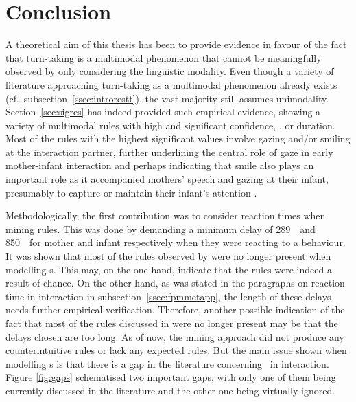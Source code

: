 
\chapter{Conclusion}
\label{ch:con}
A theoretical aim of this thesis has been to provide evidence in favour of the fact that turn-taking is a multimodal phenomenon that cannot be meaningfully observed by only considering the linguistic modality.
Even though a variety of literature approaching turn-taking as a multimodal phenomenon already exists (cf.~subsection~\ref{ssec:introrestt}), the vast majority still assumes unimodality.
Section~\ref{sec:sigres} has indeed provided such empirical evidence, showing a variety of multimodal rules with high and significant confidence, \noc, or duration.
Most of the rules with the highest significant values involve gazing and/or smiling at the interaction partner, further underlining the central role of gaze in early mother-infant interaction and perhaps indicating that smile also plays an important role as it accompanied mothers' speech and gazing at their infant, presumably to capture or maintain their infant's attention \citep{nomikou_educating_2013,nomikou_constructing_2016}.

Methodologically, the first contribution was to consider reaction times when mining rules.
This was done by demanding a minimum delay of 289~\ms\ and 850~\ms\ for mother and infant respectively when they were reacting to a behaviour.
It was shown that most of the rules observed by \citet{rohlfing_multimodal_underreview} were no longer present when modelling \rt s.
This may, on the one hand, indicate that the rules were indeed a result of chance.
On the other hand, as was stated in the paragraphs on reaction time in interaction in subsection~\ref{ssec:fpmmetapp}, the length of these delays needs further empirical verification.
Therefore, another possible indication of the fact that most of the rules discussed in \citet{rohlfing_multimodal_underreview} were no longer present may be that the delays chosen are too long.
As of now, the mining approach did not produce any counterintuitive rules or lack any expected rules.
But the main issue shown when modelling \rt s is that there is a gap in the literature concerning \rt\ in interaction.
Figure \ref{fig:gaps} schematised two important gaps, with only one of them being currently discussed in the literature and the other one being virtually ignored.

